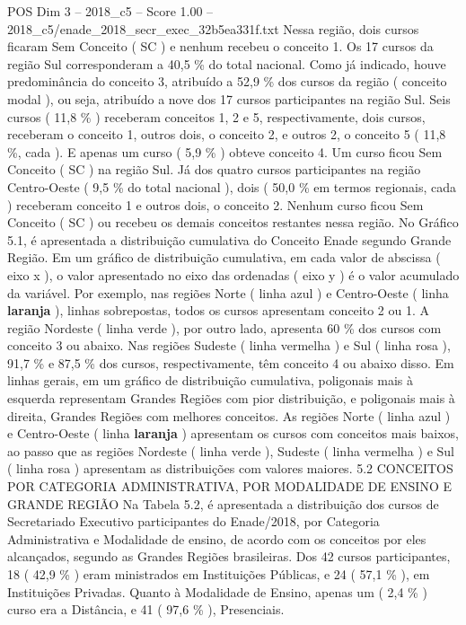 \begin{textsample}{POS Dim 3 – 2018\_c5 – Score 1.00 – 2018\_c5/enade\_2018\_secr\_exec\_32b5ea331f.txt}
Nessa região, dois cursos ficaram Sem Conceito ( SC ) e nenhum recebeu o conceito 1.
Os 17 cursos da região Sul corresponderam a 40,5 \% do total nacional.
Como já indicado, houve predominância do conceito 3, atribuído a 52,9 \% dos cursos da região ( conceito modal ), ou seja, atribuído a nove dos 17 cursos participantes na região Sul.
Seis cursos ( 11,8 \% ) receberam conceitos 1, 2 e 5, respectivamente, dois cursos, receberam o conceito 1, outros dois, o conceito 2, e outros 2, o conceito 5 ( 11,8 \%, cada ).
E apenas um curso ( 5,9 \% ) obteve conceito 4.
Um curso ficou Sem Conceito ( SC ) na região Sul.
Já dos quatro cursos participantes na região Centro-Oeste ( 9,5 \% do total nacional ), dois ( 50,0 \% em termos regionais, cada ) receberam conceito 1 e outros dois, o conceito 2.
Nenhum curso ficou Sem Conceito ( SC ) ou recebeu os demais conceitos restantes nessa região.
No Gráfico 5.1, é apresentada a distribuição cumulativa do Conceito Enade segundo Grande Região.
Em um gráfico de distribuição cumulativa, em cada valor de abscissa ( eixo x ), o valor apresentado no eixo das ordenadas ( eixo y ) é o valor acumulado da variável.
Por exemplo, nas regiões Norte ( linha azul ) e Centro-Oeste ( linha \textbf{laranja} ), linhas sobrepostas, todos os cursos apresentam conceito 2 ou 1.
A região Nordeste ( linha verde ), por outro lado, apresenta 60 \% dos cursos com conceito 3 ou abaixo.
Nas regiões Sudeste ( linha vermelha ) e Sul ( linha rosa ), 91,7 \% e 87,5 \% dos cursos, respectivamente, têm conceito 4 ou abaixo disso.
Em linhas gerais, em um gráfico de distribuição cumulativa, poligonais mais à esquerda representam Grandes Regiões com pior distribuição, e poligonais mais à direita, Grandes Regiões com melhores conceitos.
As regiões Norte ( linha azul ) e Centro-Oeste ( linha \textbf{laranja} ) apresentam os cursos com conceitos mais baixos, ao passo que as regiões Nordeste ( linha verde ), Sudeste ( linha vermelha ) e Sul ( linha rosa ) apresentam as distribuições com valores maiores. 5.2 CONCEITOS POR CATEGORIA ADMINISTRATIVA, POR MODALIDADE DE ENSINO E GRANDE REGIÃO Na Tabela 5.2, é apresentada a distribuição dos cursos de Secretariado Executivo participantes do Enade/2018, por Categoria Administrativa e Modalidade de ensino, de acordo com os conceitos por eles alcançados, segundo as Grandes Regiões brasileiras.
Dos 42 cursos participantes, 18 ( 42,9 \% ) eram ministrados em Instituições Públicas, e 24 ( 57,1 \% ), em Instituições Privadas.
Quanto à Modalidade de Ensino, apenas um ( 2,4 \% ) curso era a Distância, e 41 ( 97,6 \% ), Presenciais.

\end{textsample}

